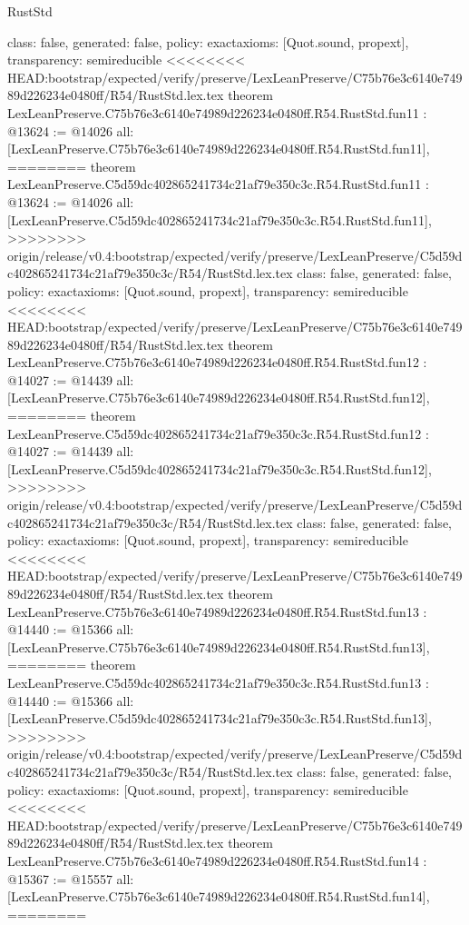 \begin{lexlean}{RustStd}
\begin{coremodule}
{\begin{coremodule}
{{{{{{{{{{{{{{  class: false,
  generated: false,
  policy: exact{axioms: [Quot.sound, propext]},
  transparency: semireducible
}
<<<<<<<< HEAD:bootstrap/expected/verify/preserve/LexLeanPreserve/C75b76e3c6140e74989d226234e0480ff/R54/RustStd.lex.tex
theorem LexLeanPreserve.C75b76e3c6140e74989d226234e0480ff.R54.RustStd.fun11 : @13624 := @14026 {
  all: [LexLeanPreserve.C75b76e3c6140e74989d226234e0480ff.R54.RustStd.fun11],
========
theorem LexLeanPreserve.C5d59dc402865241734c21af79e350c3c.R54.RustStd.fun11 : @13624 := @14026 {
  all: [LexLeanPreserve.C5d59dc402865241734c21af79e350c3c.R54.RustStd.fun11],
>>>>>>>> origin/release/v0.4:bootstrap/expected/verify/preserve/LexLeanPreserve/C5d59dc402865241734c21af79e350c3c/R54/RustStd.lex.tex
  class: false,
  generated: false,
  policy: exact{axioms: [Quot.sound, propext]},
  transparency: semireducible
}
<<<<<<<< HEAD:bootstrap/expected/verify/preserve/LexLeanPreserve/C75b76e3c6140e74989d226234e0480ff/R54/RustStd.lex.tex
theorem LexLeanPreserve.C75b76e3c6140e74989d226234e0480ff.R54.RustStd.fun12 : @14027 := @14439 {
  all: [LexLeanPreserve.C75b76e3c6140e74989d226234e0480ff.R54.RustStd.fun12],
========
theorem LexLeanPreserve.C5d59dc402865241734c21af79e350c3c.R54.RustStd.fun12 : @14027 := @14439 {
  all: [LexLeanPreserve.C5d59dc402865241734c21af79e350c3c.R54.RustStd.fun12],
>>>>>>>> origin/release/v0.4:bootstrap/expected/verify/preserve/LexLeanPreserve/C5d59dc402865241734c21af79e350c3c/R54/RustStd.lex.tex
  class: false,
  generated: false,
  policy: exact{axioms: [Quot.sound, propext]},
  transparency: semireducible
}
<<<<<<<< HEAD:bootstrap/expected/verify/preserve/LexLeanPreserve/C75b76e3c6140e74989d226234e0480ff/R54/RustStd.lex.tex
theorem LexLeanPreserve.C75b76e3c6140e74989d226234e0480ff.R54.RustStd.fun13 : @14440 := @15366 {
  all: [LexLeanPreserve.C75b76e3c6140e74989d226234e0480ff.R54.RustStd.fun13],
========
theorem LexLeanPreserve.C5d59dc402865241734c21af79e350c3c.R54.RustStd.fun13 : @14440 := @15366 {
  all: [LexLeanPreserve.C5d59dc402865241734c21af79e350c3c.R54.RustStd.fun13],
>>>>>>>> origin/release/v0.4:bootstrap/expected/verify/preserve/LexLeanPreserve/C5d59dc402865241734c21af79e350c3c/R54/RustStd.lex.tex
  class: false,
  generated: false,
  policy: exact{axioms: [Quot.sound, propext]},
  transparency: semireducible
}
<<<<<<<< HEAD:bootstrap/expected/verify/preserve/LexLeanPreserve/C75b76e3c6140e74989d226234e0480ff/R54/RustStd.lex.tex
theorem LexLeanPreserve.C75b76e3c6140e74989d226234e0480ff.R54.RustStd.fun14 : @15367 := @15557 {
  all: [LexLeanPreserve.C75b76e3c6140e74989d226234e0480ff.R54.RustStd.fun14],
========
}}}}}}}}}}}}}}}}}
\end{coremodule}}
\end{coremodule}
\end{lexlean}
